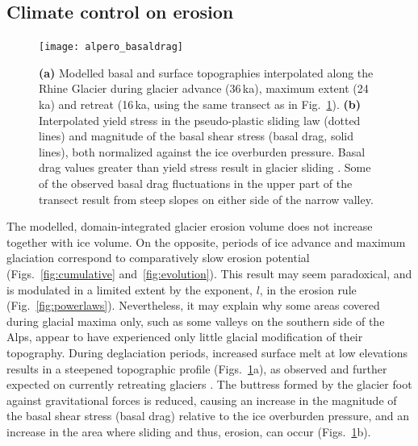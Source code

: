 \documentclass[esurf, manuscript]{copernicus}
\begin{document}
\subsection{Climate control on erosion}

    \begin{figure}
      \centerline{\texttt{[image: alpero\_basaldrag]}}
      \caption{%
        \textbf{(a)} Modelled basal and surface topographies interpolated along
        the Rhine Glacier during glacier advance (36\,ka), maximum extent
        (24\,ka) and retreat (16\,ka, using the same transect as in
        Fig.~\ref{fig:basaldrag}).
        \textbf{(b)} Interpolated yield stress in the pseudo-plastic sliding law
        (dotted lines) and magnitude of the basal shear stress (basal drag,
        solid lines), both normalized against the ice overburden pressure.
        Basal drag values greater than yield stress result in glacier sliding
        \citep[cf.][for model physics]{Seguinot.2014, Seguinot.etal.2016}.
        Some of the observed basal drag fluctuations in the upper part of the
        transect result from steep slopes on either side of the narrow valley.}
      \label{fig:basaldrag}
    \end{figure}

    The modelled, domain-integrated glacier erosion volume does not increase
    together with ice volume. On the opposite, periods of ice advance and
    maximum glaciation correspond to comparatively slow erosion potential
    (Figs.~\ref{fig:cumulative} and~\ref{fig:evolution}).
    This result may seem paradoxical, and is modulated in a limited extent by
    the exponent, $l$, in the erosion rule (Fig.~\ref{fig:powerlaws}).
    Nevertheless, it may explain why some areas covered during glacial maxima
    only, such as some valleys on the southern side of the Alps, appear to have
    experienced only little glacial modification of their topography.
    During deglaciation periods, increased surface melt at low elevations
    results in a steepened topographic profile (Figs.~\ref{fig:basaldrag}a),
    as observed and further expected on currently retreating glaciers
    \citep{Huss.etal.2010, Zekollari.Huybrechts.2015}.
    The buttress formed by the glacier foot against gravitational forces is
    reduced, causing an increase in the magnitude of the basal shear stress
    (basal drag) relative to the ice overburden pressure, and an increase in
    the area where sliding and thus, erosion, can occur
    (Figs.~\ref{fig:basaldrag}b).
\end{document}
